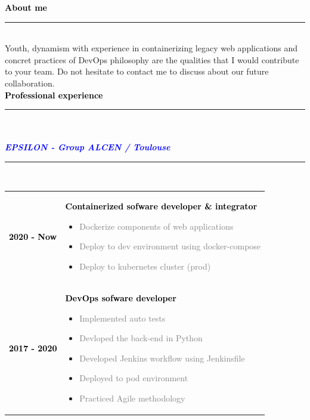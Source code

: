 \documentclass[12pt,A4]{article}
\begin{document}
\begin{minipage}[t]{0.68\textwidth}
%
%
\textcolor{black}{\large \bf About me \vspace{-5pt}\\}
\noindent\textcolor{blue}{\rule{13cm}{.8mm}}\\
%
\hspace*{5mm}
Youth, dynamism with experience in containerizing legacy web applications and concret practices of DevOps philosophy  are the qualities that I would contribute to your team.
Do not hesitate to contact me to discuss about our future collaboration.
%
%
\vspace*{1cm}\\
\textcolor{black}{\large \bf Professional experience \vspace{-5pt}\\}
\noindent\textcolor{blue}{\rule{13cm}{.8mm}}\\
%
\vspace*{-5pt}\\
\textcolor{blue}{\bf \textit{EPSILON - Group ALCEN / Toulouse}}\hfill\textcolor{gray!40}{\rule{5cm}{2mm}}\\
\begin{tabular}{P{2.5cm}p{10cm}}
\textcolor{black}{\bf 2020 - Now} & \textcolor{black}{\bf Containerized sofware developer \& integrator}
\begin{itemize}
  \item \small \textcolor{gray}{Dockerize components of web applications}
  \item \small \textcolor{gray}{Deploy to dev environment using docker-compose}
  \item \small \textcolor{gray}{Deploy to kubernetes cluster (prod)}
\end{itemize}\\
\textcolor{black}{\bf 2017 - 2020} & \textcolor{black}{\bf DevOps sofware developer}
\begin{itemize}
  \item \small \textcolor{gray}{Implemented auto tests}
  \item \small \textcolor{gray}{Devloped the back-end in Python}
  \item \small \textcolor{gray}{Developed Jenkins workflow using Jenkinsfile}
  \item \small \textcolor{gray}{Deployed to pod environment}
  \item \small \textcolor{gray}{Practiced Agile methodology}
\end{itemize}\\

\end{tabular}
\end{minipage}
\end{document}
